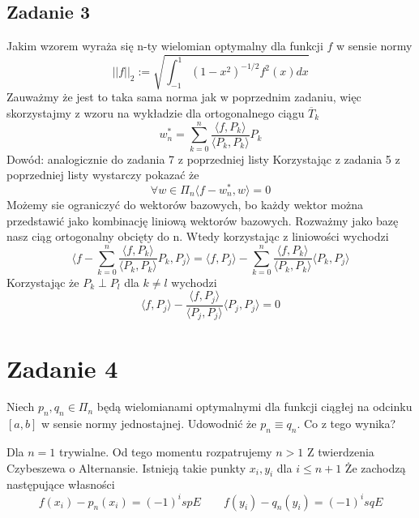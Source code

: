 \documentclass{article}
\begin{document}
\subsection*{Zadanie 3}
Jakim wzorem wyraża się n-ty wielomian optymalny dla funkcji $f$ w sensie normy
\[
  ||f||_2 := \sqrt{\int^1_{-1} 
    (1-x^2)^{-1/2} f^2 (x) dx
  }  
\]
Zauważmy że jest to taka sama norma jak w poprzednim zadaniu, więc skorzystajmy z wzoru na wykładzie dla ortogonalnego ciągu $\overline{T}_k$
\[
  w^*_n = \sum^n_{k=0} \frac{\langle f, P_k \rangle}{\langle P_k , P_k \rangle} P_k  
\]
Dowód:
analogicznie do zadania 7 z poprzedniej listy
Korzystając z zadania 5 z poprzedniej listy wystarczy pokazać że
\[ 
    \forall w \in \Pi_n \langle f - w^*_n , w \rangle = 0 
\]
Możemy sie ograniczyć do wektorów bazowych, bo każdy wektor można przedstawić jako kombinację liniową wektorów bazowych. Rozważmy jako bazę nasz ciąg ortogonalny obcięty do n.
Wtedy korzystając z liniowości wychodzi
\[
  \langle f -  \sum^n_{k=0} \frac{\langle f, P_k \rangle}{\langle P_k , P_k \rangle} P_k, P_j \rangle = \langle f, P_j \rangle - \sum^n_{k=0} \frac{\langle f, P_k \rangle}{\langle P_k , P_k \rangle}\langle  P_k, P_j \rangle
\]
Korzystając że $P_k \perp P_l$ dla $k \neq l$ wychodzi
\[
  \langle f, P_j\rangle - \frac{\langle f , P_j \rangle}{\langle P_j , P_j \rangle} \langle P_j, P_j \rangle = 0
\]
\section*{Zadanie 4}
Niech $p_n, q_n \in \Pi_n$ będą wielomianami optymalnymi dla funkcji ciągłej na odcinku $[a,b]$ w sensie normy jednostajnej. Udowodnić że $p_n \equiv q_n$. Co z tego wynika?

Dla $n =1$ trywialne.
Od tego momentu rozpatrujemy $n > 1$
Z twierdzenia Czybeszewa o Alternansie. Istnieją takie punkty $x_i,y_i$ dla $i \leq n+1$
Że zachodzą następujące własności
\[ f(x_i) - p_n(x_i) = (-1)^i sp E \qquad f(y_i) - q_n(y_i) = (-1)^i sq E \]
\end{document}
